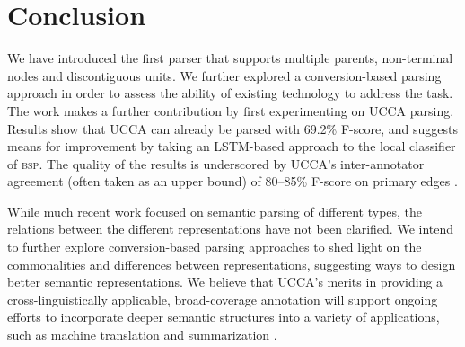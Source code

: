 \documentclass[11pt]{article}
\begin{document}
\section{Conclusion}\label{sec:conclusion}

We have introduced the first parser that supports multiple parents, non-terminal
nodes and discontiguous units.
We further explored a conversion-based parsing approach in order to assess the ability of existing
technology to address the task.
The work makes a further contribution by first experimenting on UCCA parsing.
Results show that UCCA can already be parsed with 69.2\% F-score,
and suggests means for improvement by taking an LSTM-based
approach to the local classifier of \textsc{bsp}.
The quality of the results is underscored by UCCA's inter-annotator
agreement (often taken as an upper bound) of 
80--85\% F-score on primary edges \cite{abend2013universal}.




While much recent work focused on semantic parsing of different types,
the relations between the different representations have not been clarified.
We intend to further explore conversion-based parsing approaches to shed light
on the commonalities and differences between representations, suggesting ways to
design better semantic representations.
We believe that UCCA's merits in providing a cross-linguistically applicable, broad-coverage
annotation will support ongoing efforts to incorporate deeper semantic structures
into a variety of applications, such as machine translation \cite{jones2012semantics}
and summarization \cite{liu2015toward}.
\end{document}
